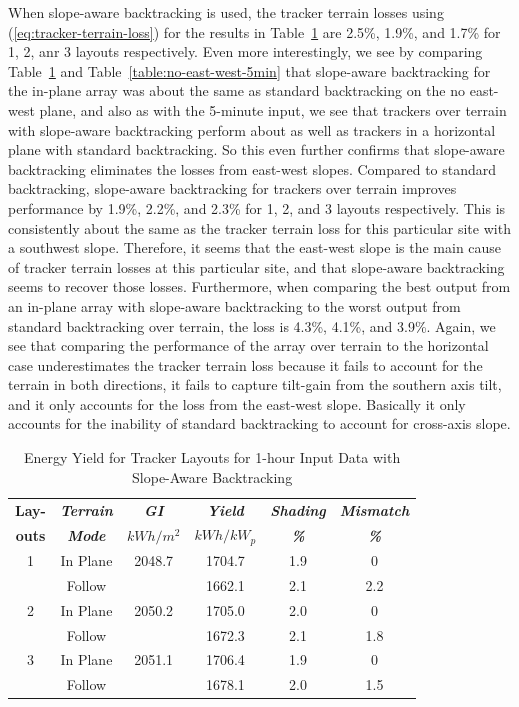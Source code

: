 \documentclass[conference]{IEEEtran}
\begin{document}
When slope-aware backtracking is used, the tracker terrain losses using (\ref{eq:tracker-terrain-loss}) for the results in Table~\ref{table:slope-1hr} are 2.5\%, 1.9\%, and 1.7\% for 1, 2, anr 3 layouts respectively. Even more interestingly, we see by comparing Table~\ref{table:slope-1hr} and Table~\ref{table:no-east-west-5min} that slope-aware backtracking for the in-plane array was about the same as standard backtracking on the no east-west plane, and also as with the 5-minute input, we see that trackers over terrain with slope-aware backtracking perform about as well as trackers in a horizontal plane with standard backtracking. So this even further confirms that slope-aware backtracking eliminates the losses from east-west slopes. Compared to standard backtracking, slope-aware backtracking for trackers over terrain improves performance by 1.9\%, 2.2\%, and 2.3\% for 1, 2, and 3 layouts respectively. This is consistently about the same as the tracker terrain loss for this particular site with a southwest slope. Therefore, it seems that the east-west slope is the main cause of tracker terrain losses at this particular site, and that slope-aware backtracking seems to recover those losses. Furthermore, when comparing the best output from an in-plane array with slope-aware backtracking to the worst output from standard backtracking over terrain, the loss is 4.3\%, 4.1\%, and 3.9\%. Again, we see that comparing the performance of the array over terrain to the horizontal case underestimates the tracker terrain loss because it fails to account for the terrain in both directions, it fails to capture tilt-gain from the southern axis tilt, and it only accounts for the loss from the east-west slope. Basically it only accounts for the inability of standard backtracking to account for cross-axis slope.

\begin{table}[htbp]
\caption{Energy Yield for Tracker Layouts for 1-hour Input Data with Slope-Aware Backtracking}
\begin{center}
\begin{tabular}{|c|c|c|c|c|c|}
\hline
\textbf{Lay-}& \textbf{\textit{Terrain}}& \textbf{\textit{GI}}&        \textbf{\textit{Yield}}&        \textbf{\textit{Shading}}& \textbf{\textit{Mismatch}} \\
\textbf{outs}& \textbf{\textit{Mode}}&    \textbf{\textit{$kWh/m^2$}}& \textbf{\textit{$kWh / kW_p$}}& \textbf{\textit{\%}}&      \textbf{\textit{\%}} \\
\hline
1& In Plane& 2048.7&  1704.7& 1.9& 0 \\
 & Follow&         &  1662.1& 2.1& 2.2 \\
\hline
2& In Plane& 2050.2&  1705.0& 2.0& 0 \\
 & Follow&         &  1672.3& 2.1& 1.8 \\
\hline
3& In Plane& 2051.1&  1706.4& 1.9& 0 \\
 & Follow&         &  1678.1& 2.0& 1.5 \\
\hline
\end{tabular}
\label{table:slope-1hr}
\end{center}
\end{table}
\end{document}
